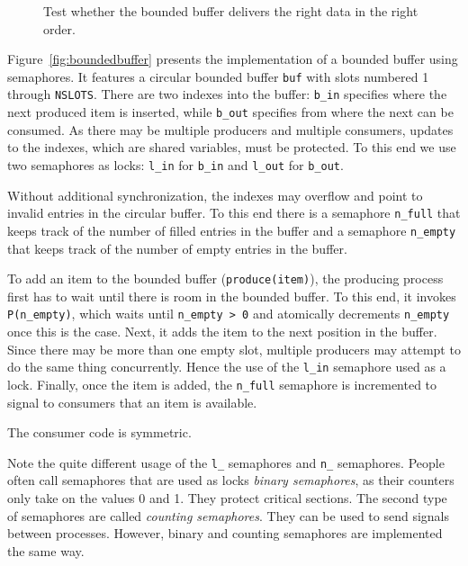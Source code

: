 \documentclass{report}
\newenvironment{code}{
\tcolorbox
}{
\endtcolorbox
}
\begin{document}
\begin{figure}
\begin{code}
\end{code}
\caption{Test whether the bounded buffer delivers the right data in the
right order.}
\label{fig:PCsemadata}
\end{figure}

Figure~\ref{fig:boundedbuffer} presents the implementation of a bounded
buffer using semaphores.  It features a circular bounded buffer \texttt{buf} with
slots numbered 1 through \texttt{NSLOTS}.  There are two indexes into
the buffer: \texttt{b\_in} specifies where the next produced item is inserted,
while \texttt{b\_out} specifies from where the next can be consumed.
As there may be multiple producers and multiple
consumers, updates to the indexes, which are shared variables, must be protected.
To this end we use two semaphores as locks: \texttt{l\_in} for \texttt{b\_in}
and \texttt{l\_out} for \texttt{b\_out}.

Without additional synchronization, the indexes may overflow and point to invalid
entries in the circular buffer.
To this end there is a semaphore \texttt{n\_full} that
keeps track of the number of filled entries in the buffer and a semaphore
\texttt{n\_empty} that keeps track of the number of empty entries in the buffer.

To add an item to the bounded buffer (\texttt{produce(item)}), the producing
process first has to wait until there is room in the bounded buffer.
To this end, it invokes \texttt{P(n\_empty)}, which waits until
\texttt{n\_empty > 0} and atomically decrements \texttt{n\_empty} once this
is the case.  Next, it adds the item to the next position in the buffer.
Since there may be more than one empty slot, multiple producers may attempt
to do the same thing concurrently.  Hence the use of the \texttt{l\_in}
semaphore used as a lock.  Finally, once the item is added, the
\texttt{n\_full} semaphore is incremented to signal to consumers that
an item is available.

The consumer code is symmetric.

Note the quite different usage of the \texttt{l\_} semaphores and \texttt{n\_}
semaphores.
People often call semaphores that are used as locks \emph{binary semaphores},
as their counters only take on the values 0 and 1.
They protect critical sections.
The second type of semaphores are called \emph{counting semaphores}.
They can be used to send signals between processes.
However, binary and counting semaphores are implemented the same way.
\end{document}
